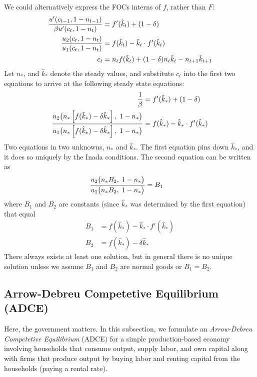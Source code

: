 \documentclass[12pt]{article}
\theoremstyle{plain}
\theoremstyle{definition}
\theoremstyle{remark}
\begin{document}
We could alternatively express the FOCs interns of $f$, rather than $F$:
\begin{align}
  \frac{u'(c_{t-1},1-n_{t-1})}{\beta u'(c_{t},1-n_t)}
  &= f'(\hat{k}_t) + (1-\delta) \notag \\
  \frac{u_2(c_t,1-n_t)}{u_1(c_t,1-n_t)} &= f(\hat{k}_t) - \hat{k}_t\cdot
  f'(\hat{k}_t) \notag \\
  c_t &= n_t f(\hat{k}_t) + (1-\delta)n_t \hat{k}_t - n_{t+1} \hat{k}_{t+1}\notag
\end{align}
Let $n_*$, and $\hat{k}_*$ denote the steady values, and substitute
$c_t$ into the first two equations to arrive at the following steady
state equations:
\begin{align}
  \frac{1}{\beta}
  &= f'(\hat{k}_*) + (1-\delta) \notag \\
  \frac{u_2\big(n_* \left[f(\hat{k}_*) - \delta\hat{k}_*\right],\;1-n_*\big)}{%
    u_1\big(n_* \left[f(\hat{k}_*) - \delta\hat{k}_*\right],\;1-n_*\big)}
    &= f(\hat{k}_*) - \hat{k}_*\cdot
  f'(\hat{k}_*) \notag
\end{align}
Two equations in two unknowns, $n_*$ and $\hat{k}_*$. The first equation
pins down $\hat{k}_*$, and it does so uniquely by the Inada conditions.
The second equation can be written as
\begin{align*}
  \frac{u_2\big(n_* B_2,\;1-n_*\big)}{%
    u_1\big(n_* B_2,\;1-n_*\big)}
    &= B_1
\end{align*}
where $B_1$ and $B_2$ are constants (since $\hat{k}_*$ was determined by
the first equation) that equal
\begin{align*}
  B_1 &= f(\hat{k}_*) - \hat{k}_*\cdot f'(\hat{k}_*) \\
  B_2 &= f(\hat{k}_*) - \delta\hat{k}_*
\end{align*}
There always exists at least one solution, but in general there is no
unique solution unless we assume $B_1$ and $B_2$ are normal goods or
$B_1=B_2$.

\clearpage
\subsection{Arrow-Debreu Competetive Equilibrium (ADCE)}

Here, the government matters.
In this subsection, we formulate an
\emph{Arrow-Debreu Competetive Equilibrium} (ADCE) for a simple
production-based economy involving households that consume output,
supply labor, and own capital along with firms that produce output by
buying labor and renting capital from the households (paying a rental
rate).
\end{document}
